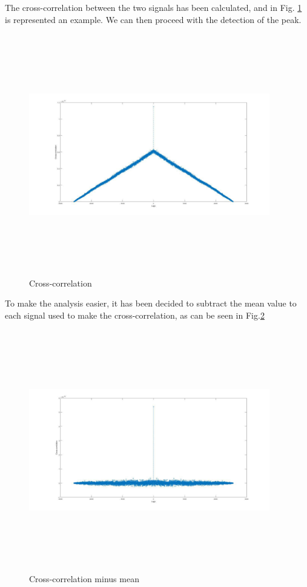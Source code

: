 The cross-correlation between the two signals has been calculated, and in Fig. \ref{fig:xcross} is represented an example. We can then proceed with the detection of the peak.
\begin{figure}[H]
	\centering
	\includegraphics[height=10.5cm, width=10.5cm, keepaspectratio]{img/xcross.jpg}
	\caption{Cross-correlation}\label{fig:xcross}
\end{figure}
To make the analysis easier, it has been decided to subtract the mean value to each signal used to make the cross-correlation, as can be seen in Fig.\ref{fig:xcross-mean}
\begin{figure}[H]
	\centering
	\includegraphics[height=10.5cm, width=10.5cm, keepaspectratio]{img/xcross-mean.jpg}
	\caption{Cross-correlation minus mean}\label{fig:xcross-mean}
\end{figure}

